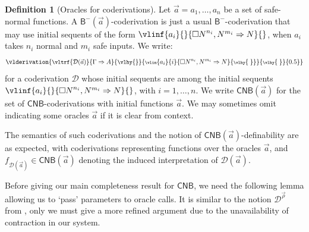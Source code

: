 \documentclass[manuscript,screen]{acmart}
\theoremstyle{definition}
\newtheorem{defn}[thm]{Definition}
\theoremstyle{remark}
\newcommand{\n}{N}
\newcommand{\sq}{\Box}
\newcommand{\sqn}{{\sq\n}}
\newcommand{\sn}{\sqn}
\newcommand{\denot}[1]{f_{#1}}
\newcommand{\bc}{\mathsf{B}}
\newcommand{\bcnorec}{\bc^{-}}
\newcommand{\nested}{\mathsf{N}}
\newcommand{\seqar}{\Rightarrow}
\newcommand{\der}{\mathcal{D}}
\newcommand{\cyclic}{\mathsf{C}}
\newcommand{\ncbc}{\cyclic\nested\bc}
\begin{document}
\begin{defn}
[Oracles for coderivations]
\label{defn:derivation-oracles}
Let $\vec{a}=a_1,\ldots, a_n$ be a set of safe-normal functions. A $\bcnorec(\vec a)$-coderivation is just a usual $\bcnorec$-coderivation that may use initial sequents of the form
$\vlinf{a_i}{}{\sn^{n_i},\n^{m_i}\seqar \n }{}$, when $a_i $ takes $n_i$ normal and $m_i$ safe inputs. 
We write:
\begin{equation*}
    \toks0={0.5}
    \vlderivation{
    \small
\vltrf{\mathcal{D}(\vec a)}{\Gamma\seqar A}{\vlhy{}}{\scriptsize \vlin{a_i}{i}{\sn^{n_i},\n^{m_i}\seqar \n }{\vlhy{\ }}}{\vlhy{\ }}{\the\toks0}
}
\end{equation*}
for a coderivation $\der$ whose initial sequents are among the initial sequents  $\vlinf{a_i}{}{\sn^{n_i},\n^{m_i}\seqar \n }{}$, with $i=1,\dots, n$.  We write $ \ncbc(\vec{a})$ for the set of $\ncbc$-coderivations  with initial functions $\vec{a}$. 
We may sometimes omit indicating some oracles $\vec a$ if it is clear from context.

The semantics of such coderivations  and the notion of $\ncbc(\vec a)$-definability are as expected, with coderivations representing functions over the oracles $\vec a$, and   $\denot{\der(\vec a)}\in \ncbc(\vec{a})$ denoting the induced interpretation of $\der(\vec a)$. 
\end{defn}




Before giving our main completeness result for $\ncbc$, we need the following lemma allowing us to `pass' parameters to oracle calls.
It is similar to the notion $\der^{\vec \rho}$ from \cite[Lemma 42]{Das2021}, only we must give a more refined argument due to the unavailability of contraction in our system.
\end{document}
